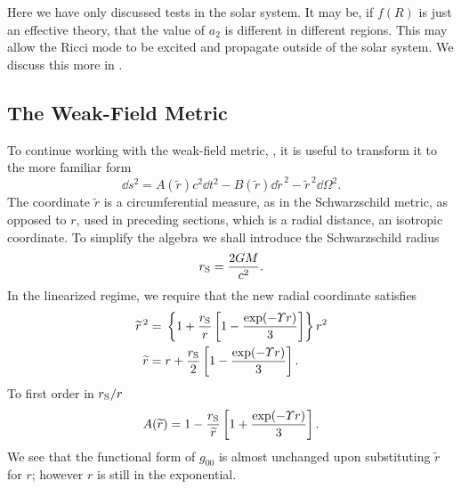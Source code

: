 Here we have only discussed tests in the solar system. It may be, if $f(R)$ is just an effective theory, that the value of $a_2$ is different in different regions. This may allow the Ricci mode to be excited and propagate outside of the solar system. We discuss this more in .

\subsection{The Weak-Field Metric}

To continue working with the weak-field metric, , it is useful to transform it to the more familiar form
\begin{equation}
\dd s^2 = A(\widetilde{r}) c^2\dd t^2 - B(\widetilde{r})\dd \widetilde{r}^{\,2} - \widetilde{r}^{\,2} \dd \Omega^2.
\label{eq:Sph_sym}
\end{equation}
The coordinate $\widetilde{r}$ is a circumferential measure, as in the Schwarzschild metric, as opposed to $r$, used in preceding sections, which is a radial distance, an isotropic coordinate\cite{Misner1973, Olmo2007c}. To simplify the algebra we shall introduce the Schwarzschild radius
\begin{equation}
r_\mathrm{S} = \frac{2GM}{c^2}.
\end{equation}
In the linearized regime, we require that the new radial coordinate satisfies
\begin{align}
\widetilde{r}^{\,2} = {} & \left\{1 + \frac{r_\mathrm{S}}{r}\left[1 - \frac{\exp(-\Upsilon r)}{3}\right]\right\}r^2 \\
\widetilde{r} = {} & r + \frac{r_\mathrm{S}}{2}\left[1 - \frac{\exp(-\Upsilon r)}{3}\right].
\label{eq:r_tilde}
\end{align}
To first order in ${r_\mathrm{S}}/{r}$\cite{Olmo2007c}
\begin{equation}
A(\widetilde{r}) = 1 - \frac{r_\mathrm{S}}{\widetilde{r}}\left[1 + \frac{\exp(-\Upsilon r )}{3}\right].
\label{eq:A_metric}
\end{equation}
We see that the functional form of $g_{00}$ is almost unchanged upon substituting $\widetilde{r}$ for $r$; however $r$ is still in the exponential.

